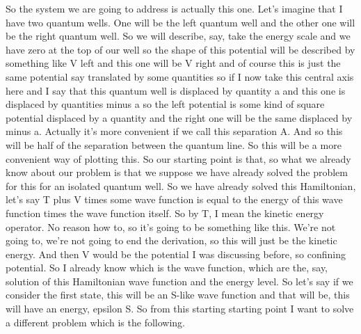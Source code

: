 So the system we are going to address is actually this one. Let's imagine that I have two quantum wells. One will be the left quantum well and the other one will be the right quantum well. So we will describe, say, take the energy scale and we have zero at the top of our well so the shape of this potential will be described by something like V left and this one will be V right and of course this is just the same potential say translated by some quantities so if I now take this central axis here and I say that this quantum well is displaced by quantity a and this one is displaced by quantities minus a so the left potential is some kind of square potential displaced by a quantity and the right one will be the same displaced by minus a. Actually it's more convenient if we call this separation A. And so this will be half of the separation between the quantum line. So this will be a more convenient way of plotting this. So our starting point is that, so what we already know about our problem is that we suppose we have already solved the problem for this for an isolated quantum well. So we have already solved this Hamiltonian, let's say T plus V times some wave function is equal to the energy of this wave function times the wave function itself. So by T, I mean the kinetic energy operator. No reason how to, so it's going to be something like this. We're not going to, we're not going to end the derivation, so this will just be the kinetic energy. And then V would be the potential I was discussing before, so confining potential. So I already know which is the wave function, which are the, say, solution of this Hamiltonian wave function and the energy level. So let's say if we consider the first state, this will be an S-like wave function and that will be, this will have an energy, epsilon S. So from this starting starting point I want to solve a different problem which is the following.

